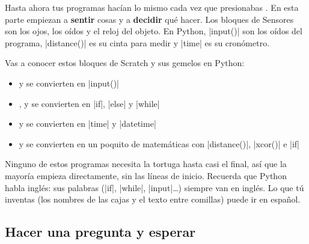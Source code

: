 
Hasta ahora tus programas hacían lo mismo cada vez que presionabas \playbtn. En esta parte empiezan a \textbf{sentir} cosas y a \textbf{decidir} qué hacer. Los bloques de Sensores son los ojos, los oídos y el reloj del objeto. En Python, \py|input()| son los oídos del programa, \py|distance()| es su cinta para medir y \py|time| es su cronómetro.

Vas a conocer estos bloques de Scratch y sus gemelos en Python:

\begin{itemize}
  \item {} y  se convierten en \py|input()|
  \item {},  y  se convierten en \py|if|, \py|else| y \py|while|
  \item {} y  se convierten en \py|time| y \py|datetime|
  \item {} y  se convierten en un poquito de matemáticas con \py|distance()|, \py|xcor()| e \py|if|
\end{itemize}

Ninguno de estos programas necesita la tortuga hasta casi el final, así que la mayoría empieza directamente, sin las líneas de inicio. Recuerda que Python habla inglés: sus palabras (\py|if|, \py|while|, \py|input|\ldots) siempre van en inglés. Lo que tú inventas (los nombres de las cajas y el texto entre comillas) puede ir en español.

\subsection*{Hacer una pregunta y esperar}


